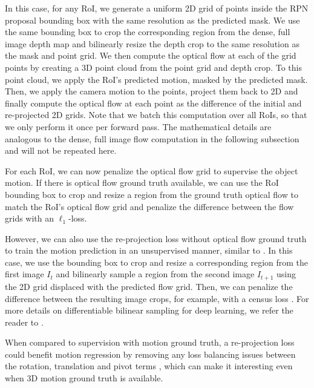 In this case, for any RoI, we generate a uniform 2D grid of points inside the RPN proposal bounding box
with the same resolution as the predicted mask. We use the same bounding box
to crop the corresponding region from the dense, full image depth map
and bilinearly resize the depth crop to the same resolution as the mask and point
grid.
We then compute the optical flow at each of the grid points by creating
a 3D point cloud from the point grid and depth crop. To this point cloud, we
apply the RoI's predicted motion, masked by the predicted mask.
Then, we apply the camera motion to the points, project them back to 2D
and finally compute the optical flow at each point as the difference of the initial and re-projected 2D grids.
Note that we batch this computation over all RoIs, so that we only perform
it once per forward pass. The mathematical details are analogous to the
dense, full image flow computation in the following subsection and will not
be repeated here. 

For each RoI, we can now penalize the optical flow grid to supervise the object motion.
If there is optical flow ground truth available, we can use the RoI bounding box to
crop and resize a region from the ground truth optical flow to match the RoI's
optical flow grid and penalize the difference between the flow grids with an $\ell_1$-loss.

However, we can also use the re-projection loss without optical flow ground truth
to train the motion prediction in an unsupervised manner, similar to \cite{SfmNet}.
In this case, we use the bounding box to crop and resize a corresponding region
from the first image $I_t$ and bilinearly sample a region from the second image $I_{t+1}$
using the 2D grid displaced with the predicted flow grid. Then, we can penalize the difference
between the resulting image crops, for example, with a census loss \cite{CensusTerm,UnFlow}.
For more details on differentiable bilinear sampling for deep learning, we refer the reader to
\cite{STN}.

When compared to supervision with motion ground truth, a re-projection
loss could benefit motion regression by removing any loss balancing issues between the
rotation, translation and pivot terms \cite{PoseNet2},
which can make it interesting even when 3D motion ground truth is available.


